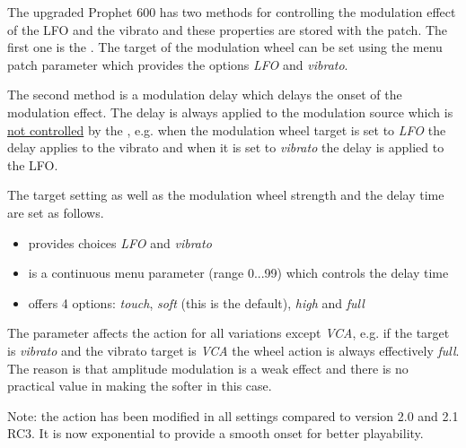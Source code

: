 The upgraded Prophet 600 has two methods for controlling the modulation effect of the LFO and the vibrato and these properties are  stored with the patch. The first one is the \modwheel. The target of the modulation wheel can be set using the menu patch parameter \modwheeltarget which provides the options \textit{LFO} and \textit{vibrato}. 

The second method is a modulation delay which delays the onset of the modulation effect. The delay is always applied to the modulation source which is \underline{not controlled} by the \modwheel, e.g. when the modulation wheel target is set to \textit{LFO} the delay applies to the vibrato and when it is set to \textit{vibrato} the delay is applied to the LFO.

The target setting as well as the modulation wheel strength and the delay time are set as follows. 
\begin{itemize}
  \item \modwheeltarget provides choices \textit{LFO} and \textit{vibrato}
  \item \moddelay is a continuous menu parameter (range 0...99) which controls the delay time
  \item \modwheelrange offers 4 options: \textit{touch}, \textit{soft} (this is the default), \textit{high} and \textit{full}
\end{itemize} 

The parameter \modwheelrange affects the \modwheel action for all variations except \textit{VCA}, e.g. if the target is \textit{vibrato} and the vibrato target is \textit{VCA} the wheel action is always effectively \textit{full}. The reason is that amplitude modulation is a weak effect and there is no practical value in making the \modwheel softer in this case.

Note: the \modwheel action has been modified in all settings compared to version 2.0 and 2.1 RC3. It is now exponential to provide a smooth onset for better playability.
